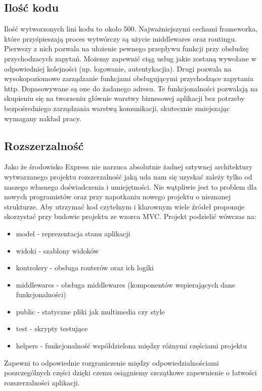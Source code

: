 \documentclass[12pt]{report}
\begin{document}
    \subsection{Ilość kodu}
      Ilość wytworzonych lini kodu to około 500. 
      Najważniejszymi cechami frameworka, które przyśpieszają proces wytwórczy są użycie middlewares oraz routingu.
      Pierwszy z nich pozwala na ułożenie pewnego przepływu funkcji przy obsłudzę przychodzacych zapytań.
      Możemy zapewnić ciąg usług jakie zostaną wywołane w odpowiedniej kolejności (np. logowanie, autentykacjia).
      Drugi pozwala na wysokopoziomowe zarządzanie funkcjami obsługującymi przychodzące zapytania http.
      Dopasowywane są one do żadanego adresu.
      Te funkcjonalności pozwalają na skupieniu się na tworzeniu głównie warstwy biznesowej aplikacji bez potrzeby bezpośredniego zarządzania warstwą komunikacji, skutecznie zmiejszając wymagany nakład pracy.

    \subsection{Rozszerzalność}
      Jako że środowisko Express nie narzuca absolutnie żadnej sztywnej architektury wytwarzanego projektu rozszerzalność jaką uda nam się uzyskać zależy tylko od naszego własnego doświadczenia i umiejętności.
      Nie wątpliwie jest to problem dla nowych programistów oraz przy napotkaniu nowego projektu o nieznanej strukturze.
      Aby utrzymać kod czytelnym i klarownym wiele źródeł proponuje skorzystać przy budowie projektu ze wzorca MVC.
      Projekt podzielić wówczas na:
      \begin{itemize}
        \item model - reprezentacja stanu aplikacji
        \item widoki - szablony widoków
        \item kontrolery - obsługa routerów oraz ich logiki
        \item middlewares - obsługa middlewares (komponentów wspierających dane funkcjonalności)
        \item public - statyczne pliki jak multimedia czy style
        \item test - skrypty testujące
        \item helpers - funkcjonalność współdzielona między różnymi częściami projektu
      \end{itemize}
      Zapewni to odpowiednie rozgraniczenie między odpowiedzialnościami poszczególnych części dzięki czemu osiągniemy szczątkowe zapewnienie o łatwości rozszerzalności aplikacji. 
      
\end{document}

